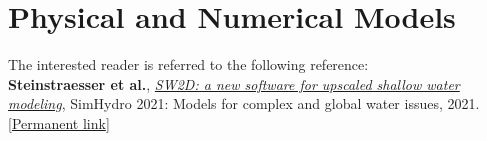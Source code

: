 \chapter{Physical and Numerical Models}

The interested reader is referred to the following reference:\\

\textbf{Steinstraesser et al.}, \textit{\href{https://hal.inria.fr/hal-03224050/document}{SW2D: a new software for upscaled shallow water modeling}}, SimHydro 2021: Models for complex and global water issues, 2021. [\href{https://hal.inria.fr/hal-03224050/document}{Permanent link}]